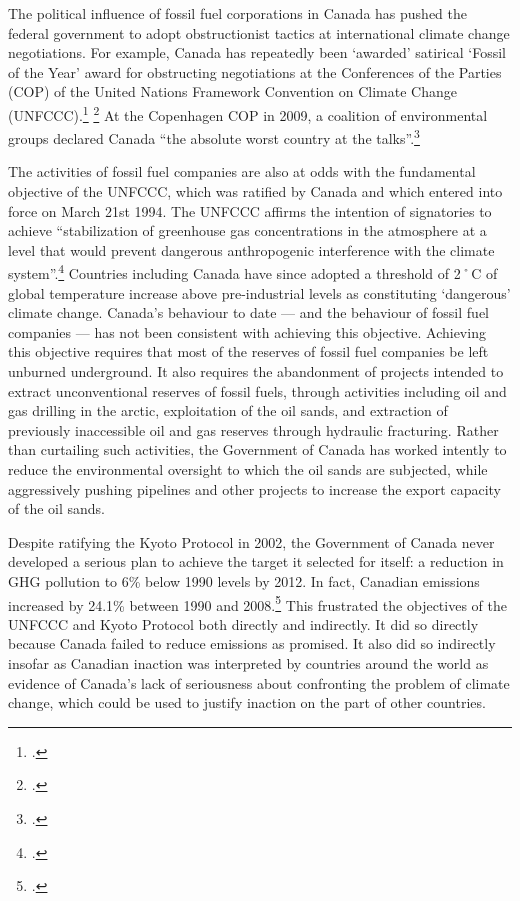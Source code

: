 The political influence of fossil fuel corporations in Canada has pushed the federal government to adopt obstructionist tactics at international climate change negotiations.
For example, Canada has repeatedly been `awarded' satirical `Fossil of the Year' award for obstructing negotiations at the Conferences of the Parties (COP) of the United Nations Framework Convention on Climate Change (UNFCCC).\footcite[][]{DurbanFossil} \footcite[See also: ][]{SimpsonBlustering}
At the Copenhagen COP in 2009, a coalition of environmental groups declared Canada ``the absolute worst country at the talks''.\footcite[][]{CBCFossil}



The activities of fossil fuel companies are also at odds with the fundamental objective of the UNFCCC, which was ratified by Canada and which entered into force on March 21st 1994.
The UNFCCC affirms the intention of signatories to achieve ``stabilization of greenhouse gas concentrations in the atmosphere at a level that would prevent dangerous anthropogenic interference with the climate system''.\footcite[][p. 4]{UNFCCC}
Countries including Canada have since adopted a threshold of 2˚C of global temperature increase above pre-industrial levels as constituting `dangerous' climate change.
Canada's behaviour to date --- and the behaviour of fossil fuel companies --- has not been consistent with achieving this objective.
Achieving this objective requires that most of the reserves of fossil fuel companies be left unburned underground.
It also requires the abandonment of projects intended to extract unconventional reserves of fossil fuels, through activities including oil and gas drilling in the arctic, exploitation of the oil sands, and extraction of previously inaccessible oil and gas reserves through hydraulic fracturing.
Rather than curtailing such activities, the Government of Canada has worked intently to reduce the environmental oversight to which the oil sands are subjected, while aggressively pushing pipelines and other projects to increase the export capacity of the oil sands.



Despite ratifying the Kyoto Protocol in 2002, the Government of Canada never developed a serious plan to achieve the target it selected for itself: a reduction in GHG pollution to 6\% below 1990 levels by 2012.
In fact, Canadian emissions increased by 24.1\% between 1990 and 2008.\footcite[][p. 3]{UNFCCCCanada2010}
This frustrated the objectives of the UNFCCC and Kyoto Protocol both directly and indirectly.
It did so directly because Canada failed to reduce emissions as promised.
It also did so indirectly insofar as Canadian inaction was interpreted by countries around the world as evidence of Canada's lack of seriousness about confronting the problem of climate change, which could be used to justify inaction on the part of other countries. 



